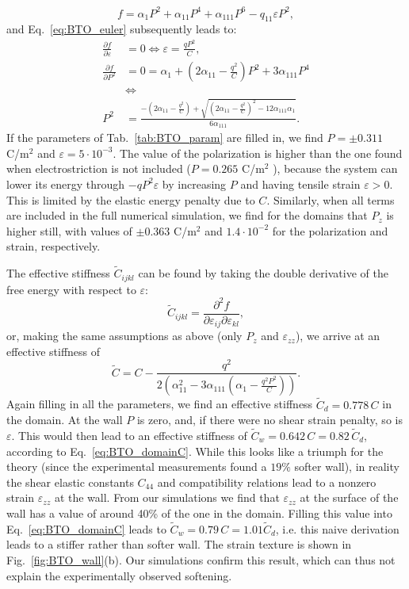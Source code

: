 \begin{equation}
	f = \alpha_1 P^2 + \alpha_{11} P^4 + \alpha_{111} P^6 - q_{11} \varepsilon P^2,
\end{equation}
and Eq.~\eqref{eq:BTO_euler} subsequently leads to:  
\begin{align}
	\frac{\partial f}{\partial \varepsilon} &= 0 \Leftrightarrow \varepsilon = \frac{qP^2}{C}\label{eq:BTO_e0},\\
	\frac{\partial f}{\partial P^2} &= 0 = \alpha_1 + (2 \alpha_{11} - \frac{q^2}{C})P^2 + 3\alpha_{111}P^4 \\
	& \Leftrightarrow \\
	P^2 &= \frac{-(2\alpha_{11} - \frac{q^2}{C}) + \sqrt{(2\alpha_{11}-\frac{q^2}{C})^2 - 12 \alpha_{111} \alpha_1}}{6\alpha_{111}}.
\end{align}
If the parameters of Tab.~\ref{tab:BTO_param} are filled in, we find $P = \pm 0.311$ C/m$^2$ and $\varepsilon = 5 \cdot 10^{-3}$.
The value of the polarization is higher than the one found when electrostriction is not included ($P = 0.265$ C/m$^2$ \cite{Marton2010}), because the system can lower its energy through $-qP^2\varepsilon$ by increasing $P$ and having tensile strain $\varepsilon > 0$. This is limited by the elastic energy penalty due to $C$.
Similarly, when all terms are included in the full numerical simulation, we find for the domains that $P_z$ is higher still, with values of $\pm 0.363$ C/m$^2$ and $1.4 \cdot 10^{-2}$ for the polarization and strain, respectively.

The effective stiffness $\tilde{C}_{ijkl}$ can be found by taking the double derivative of the free energy with respect to $\varepsilon$:
\begin{equation}
	\tilde{C}_{ijkl} = \frac{\partial^2 f}{\partial \varepsilon_{ij} \partial \varepsilon_{kl}},
\end{equation}
or, making the same assumptions as above (only $P_z$ and $\varepsilon_{zz}$), we arrive at an effective stiffness of
\begin{equation}
	\label{eq:BTO_domainC}
	\tilde{C} = C - \frac{q^2}{2\left(\alpha_{11}^2 - 3 \alpha_{111}\left(\alpha_1  - \frac{q^2 P^2}{C}\right)\right)}.
\end{equation}
Again filling in all the parameters, we find an effective stiffness $\tilde{C}_d = 0.778 \,C$ in the domain.
At the wall $P$ is zero, and, if there were no shear strain penalty, so is $\varepsilon$. This would then lead to an effective stiffness of $\tilde{C}_w = 0.642 \, C = 0.82\, \tilde{C}_d$, according to Eq.~\eqref{eq:BTO_domainC}.
While this looks like a triumph for the theory (since the experimental measurements found a $19\%$ softer wall), in reality the shear elastic constants $C_{44}$ and compatibility relations lead to a nonzero strain $\varepsilon_{zz}$ at the wall.
From our simulations we find that $\varepsilon_{zz}$ at the surface of the wall has a value of around 40\% of the one in the domain.
Filling this value into Eq.~\eqref{eq:BTO_domainC} leads to $\tilde{C}_w = 0.79 \, C = 1.01 \tilde{C}_d$, i.e. this naive derivation leads to a stiffer rather than softer wall.
The strain texture is shown in Fig.~\ref{fig:BTO_wall}(b).
Our simulations confirm this result, which can thus not explain the experimentally observed softening.

